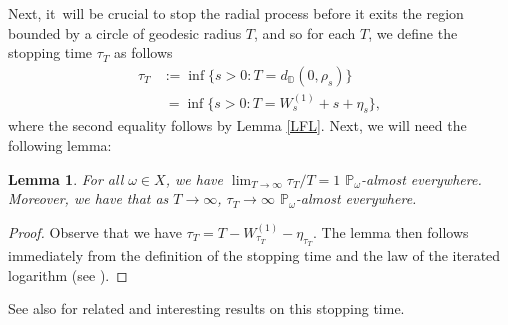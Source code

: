 \documentclass[JEP,XML,SOM,Unicode,published]{cedram}
\theoremstyle{plain}
\newtheorem{lemma}[thm]{Lemma}
\theoremstyle{definition}
\numberwithin{equation}{subsection}
\newcommand\bD{\mathbb{D}}
\newcommand\bP{\mathbb{P}}
\newcommand{\defeq}{:=}
\begin{document}
Next, it~will be crucial to stop the radial process before it exits the region bounded by a circle of geodesic radius $T$, and so for each $T$, we define the stopping time $\tau_T$ as follows
\begin{align*}
\tau_T &\defeq \inf\{s>0 :T = d_{\bD}(0,\rho_s)\} \\
&~= \inf\{s>0 :T = W_s^{(1)} + s + \eta_{s}\},
\end{align*}
where the second equality follows by Lemma \ref{LFL}. Next, we will need the following lemma:
\begin{lemma}\label{taublah}
For all $\omega \in X$, we have $\lim_{T\to\infty} \tau_T/T = 1$ $\bP_\omega$-almost everywhere. Moreover, we have that as $T\to\infty$, $\tau_T \to \infty$ $\bP_\omega$-almost everywhere.

\end{lemma}
\begin{proof} Observe that we have $\tau_T = T - W_{\tau_T}^{(1)} - \eta_{\tau_T}$. The lemma then follows immediately from the definition of the stopping time and the law of the iterated logarithm (see \cite[Cor.\,II.1.12]{RY}).\end{proof}

See also \cite[Lem.\,4.2]{EFL01} for related and interesting results on this stopping time.
\end{document}
